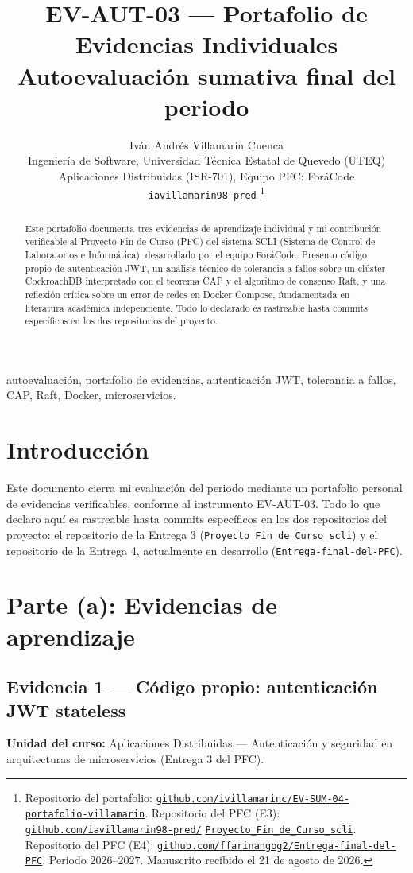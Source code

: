 \documentclass[10pt,journal,a4paper]{IEEEtran}
\title{EV-AUT-03 --- Portafolio de Evidencias Individuales\\
\large Autoevaluación sumativa final del periodo}
\author{Iván Andrés Villamarín Cuenca\\
\normalsize Ingeniería de Software, Universidad Técnica Estatal de Quevedo (UTEQ)\\
\normalsize Aplicaciones Distribuidas (ISR-701), Equipo PFC: ForáCode\\
\normalsize \texttt{iavillamarin98-pred}
\thanks{Repositorio del portafolio:
\href{https://github.com/ivillamarinc/EV-SUM-04-portafolio-villamarin}
{\nolinkurl{github.com/ivillamarinc/EV-SUM-04-portafolio-villamarin}}.
Repositorio del PFC (E3):
\href{https://github.com/iavillamarin98-pred/Proyecto_Fin_de_Curso_scli}
{\nolinkurl{github.com/iavillamarin98-pred/}}\linebreak
\href{https://github.com/iavillamarin98-pred/Proyecto_Fin_de_Curso_scli}
{\nolinkurl{Proyecto_Fin_de_Curso_scli}}.
Repositorio del PFC (E4):
\href{https://github.com/ffarinangog2/Entrega-final-del-PFC}
{\nolinkurl{github.com/ffarinangog2/Entrega-final-del-PFC}}.
Periodo 2026--2027. Manuscrito recibido el 21 de agosto de 2026.}}
\begin{document}
\maketitle

\begin{abstract}
Este portafolio documenta tres evidencias de aprendizaje individual y mi contribución
verificable al Proyecto Fin de Curso (PFC) del sistema SCLI (Sistema de Control de
Laboratorios e Informática), desarrollado por el equipo ForáCode. Presento código propio
de autenticación JWT, un análisis técnico de tolerancia a fallos sobre un clúster
CockroachDB interpretado con el teorema CAP y el algoritmo de consenso Raft, y una
reflexión crítica sobre un error de redes en Docker Compose, fundamentada en literatura
académica independiente. Todo lo declarado es rastreable hasta commits específicos en
los dos repositorios del proyecto.
\end{abstract}

\begin{IEEEkeywords}
autoevaluación, portafolio de evidencias, autenticación JWT, tolerancia a fallos, CAP,
Raft, Docker, microservicios.
\end{IEEEkeywords}

\section{Introducción}

Este documento cierra mi evaluación del periodo mediante un portafolio personal de
evidencias verificables, conforme al instrumento EV-AUT-03. Todo lo que declaro aquí es
rastreable hasta commits específicos en los dos repositorios del proyecto: el repositorio
de la Entrega 3 (\texttt{Proyecto\_Fin\_de\_Curso\_scli}) y el repositorio de la Entrega 4,
actualmente en desarrollo (\texttt{Entrega-final-del-PFC}).

\section{Parte (a): Evidencias de aprendizaje}

\subsection{Evidencia 1 --- Código propio: autenticación JWT stateless}

\textbf{Unidad del curso:} Aplicaciones Distribuidas --- Autenticación y seguridad en
arquitecturas de microservicios (Entrega 3 del PFC).
\end{document}
